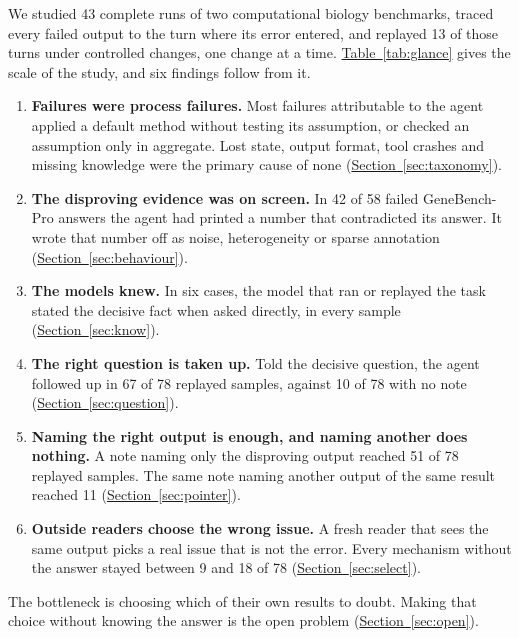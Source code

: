 \documentclass[10pt]{article}
\newcommand{\tabref}[1]{\hyperref[#1]{Table~\ref*{#1}}}
\newcommand{\sref}[1]{\hyperref[#1]{Section~\ref*{#1}}}
\begin{document}
We studied 43 complete runs of two computational biology benchmarks, traced every failed output to the turn where its error
entered, and replayed 13 of those turns under controlled changes, one change at a time. \tabref{tab:glance} gives the scale of
the study, and six findings follow from it.
\begin{enumerate}
\item \textbf{Failures were process failures.} Most failures attributable to the agent applied a default method without testing
its assumption, or checked an assumption only in aggregate. Lost state, output format, tool crashes and missing knowledge were
the primary cause of none (\sref{sec:taxonomy}).
\item \textbf{The disproving evidence was on screen.} In 42 of 58 failed GeneBench-Pro answers the agent had printed a number
that contradicted its answer. It wrote that number off as noise, heterogeneity or sparse annotation (\sref{sec:behaviour}).
\item \textbf{The models knew.} In six cases, the model that ran or replayed the task stated the decisive fact when asked directly,
in every sample (\sref{sec:know}).
\item \textbf{The right question is taken up.} Told the decisive question, the agent followed up in 67 of 78 replayed samples,
against 10 of 78 with no note (\sref{sec:question}).
\item \textbf{Naming the right output is enough, and naming another does nothing.} A note naming only the disproving output
reached 51 of 78 replayed samples. The same note naming another output of the same result reached 11 (\sref{sec:pointer}).
\item \textbf{Outside readers choose the wrong issue.} A fresh reader that sees the same output picks a real issue that is not
the error. Every mechanism without the answer stayed between 9 and 18 of 78 (\sref{sec:select}).
\end{enumerate}
The bottleneck is choosing which of their own results to doubt. Making that choice without knowing the answer is the open
problem (\sref{sec:open}).
\end{document}
